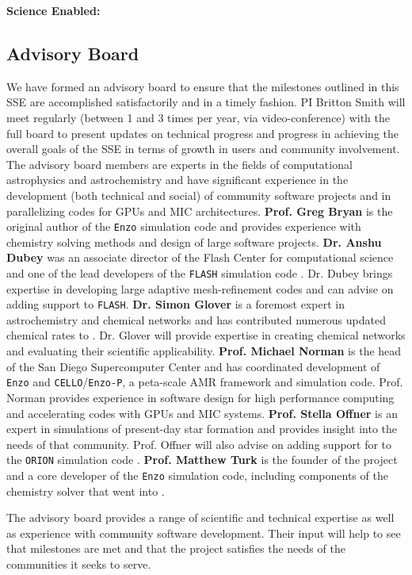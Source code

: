 \textbf{Science Enabled:}

\subsection{Advisory Board}

We have formed an advisory board to ensure that the milestones
outlined in this SSE are accomplished satisfactorily and in a timely
fashion.  PI Britton Smith will meet regularly (between 1 and 3 times
per year, via video-conference) with the full board to present updates
on technical progress and progress in achieving the overall goals of
the SSE in terms of growth in users and community involvement.  The
advisory board members are experts in the fields of computational
astrophysics and astrochemistry and have significant experience in the
development (both technical and social) of community software projects
and in parallelizing codes for GPUs and MIC architectures.
{\bf Prof. Greg Bryan} is the original author of the \texttt{Enzo}
simulation code and provides experience with chemistry solving methods
and design of large software projects.
{\bf Dr. Anshu Dubey} was an associate director of the Flash Center
for computational science and one of the lead developers of the
\texttt{FLASH} simulation code \citep{2000ApJS..131..273F,
  2009arXiv0903.4875D}.  Dr. Dubey brings expertise in developing
large adaptive mesh-refinement codes and can advise on adding
\grackle{} support to \texttt{FLASH}.
{\bf Dr. Simon Glover} is a foremost expert in astrochemistry and
chemical networks and has contributed numerous updated chemical rates to
\grackle{}.  Dr. Glover will provide expertise in creating chemical
networks and evaluating their scientific applicability.
{\bf Prof. Michael Norman} is the head of the San Diego Supercomputer
Center and has coordinated development of \texttt{Enzo} and
\texttt{CELLO}/\texttt{Enzo-P}, a peta-scale AMR framework and
simulation code.  Prof. Norman provides experience in software design for
high performance computing and accelerating codes with GPUs and MIC
systems.
{\bf Prof. Stella Offner} is an expert in simulations of present-day
star formation and provides insight into the needs of that community.
Prof. Offner will also advise on adding support for \grackle{} to the
\texttt{ORION} simulation code \citep{2012ApJ...745..139L}.
{\bf Prof. Matthew Turk} is the founder of the \yt{} project and
a core developer of the \texttt{Enzo} simulation code, including
components of the chemistry solver that went into \grackle{}.

The advisory board provides a range of scientific and technical
expertise as well as experience with community software development.
Their input will help to see that milestones are met and that
the project satisfies the needs of the communities it seeks to serve.
